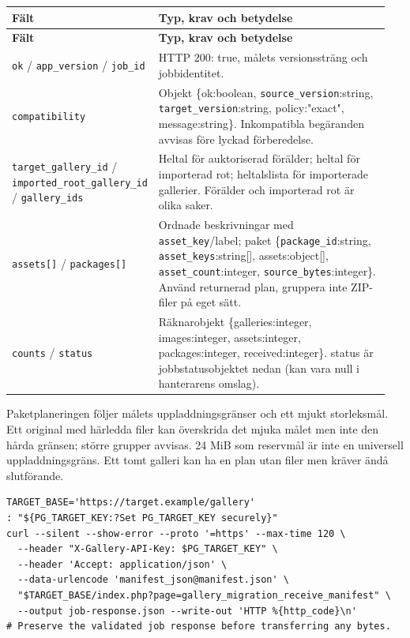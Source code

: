 \documentclass[11pt,a4paper]{article}
\newcommand{\codeword}[1]{\nolinkurl{#1}}
\begin{document}
\begin{longtable}{@{}>{\RaggedRight\arraybackslash}p{0.28\linewidth}>{\RaggedRight\arraybackslash}p{0.67\linewidth}@{}}
\toprule
\textbf{Fält} & \textbf{Typ, krav och betydelse} \\
\midrule
\endfirsthead
\toprule
\textbf{Fält} & \textbf{Typ, krav och betydelse} \\
\midrule
\endhead
\bottomrule
\endfoot
\codeword{ok} / \codeword{app_version} / \codeword{job_id} & HTTP 200: true, målets
versionssträng och jobbidentitet. \\
\codeword{compatibility} & Objekt \{ok:boolean, \codeword{source_version}:string,
\codeword{target_version}:string, policy:"exact", message:string\}. Inkompatibla begäranden
avvisas före lyckad förberedelse. \\
\codeword{target_gallery_id} / \codeword{imported_root_gallery_id} / \codeword{gallery_ids}
& Heltal för auktoriserad förälder; heltal för importerad rot; heltalslista för importerade
gallerier. Förälder och importerad rot är olika saker. \\
\codeword{assets[]} / \codeword{packages[]} & Ordnade beskrivningar med
\codeword{asset_key}/label; paket \{\codeword{package_id}:string,
\codeword{asset_keys}:string[], assets:object[], \codeword{asset_count}:integer,
\codeword{source_bytes}:integer\}. Använd returnerad plan, gruppera inte ZIP-filer på eget
sätt. \\
\codeword{counts} / \codeword{status} & Räknarobjekt \{galleries:integer, images:integer,
assets:integer, packages:integer, received:integer\}. status är jobbstatusobjektet nedan
(kan vara null i hanterarens omslag). \\
\end{longtable}

Paketplaneringen följer målets uppladdningsgränser och ett mjukt storleksmål. Ett original
med härledda filer kan överskrida det mjuka målet men inte den hårda gränsen; större grupper
avvisas. 24 MiB som reservmål är inte en universell uppladdningsgräns. Ett tomt galleri kan
ha en plan utan filer men kräver ändå slutförande.

\begin{lstlisting}[language={}]
TARGET_BASE='https://target.example/gallery'
: "${PG_TARGET_KEY:?Set PG_TARGET_KEY securely}"
curl --silent --show-error --proto '=https' --max-time 120 \
  --header "X-Gallery-API-Key: $PG_TARGET_KEY" \
  --header 'Accept: application/json' \
  --data-urlencode 'manifest_json@manifest.json' \
  "$TARGET_BASE/index.php?page=gallery_migration_receive_manifest" \
  --output job-response.json --write-out 'HTTP %{http_code}\n'
# Preserve the validated job response before transferring any bytes.
\end{lstlisting}
\end{document}

